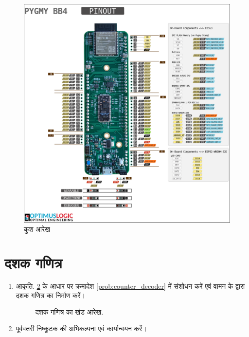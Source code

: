 \documentclass[journal,12pt,twocolumn]{IEEEtran}
\renewcommand\thesection{\arabic{section}}
\begin{document}
\begin{enumerate}[label=\thesection.\arabic*.,ref=\thesection.\theenumi]
\begin{figure}[!ht]
\centering
\includegraphics[width = \textwidth]{figs/pin_sheet.png}
\caption{कुश आरेख}
\label{fig:pin_sheet}
\end{figure}
\end{enumerate}

\section{दशक गणित्र}
\renewcommand{\theequation}{\theenumi}
\renewcommand{\thefigure}{\theenumi}
\begin{enumerate}[label=\thesection.\arabic*.,ref=\thesection.\theenumi]

\item आकृति. \ref{fig:vaman_decade_counter} के आधार पर क्रमादेश \ref{prob:counter_decoder}
में संशोधन करें एवं वामन के द्वारा दशक गणित्र का निर्माण करें।
\begin{figure}[!ht]
\centering
\resizebox{\columnwidth}{!}{

}
\caption{दशक गणित्र का खंड आरेख.}
\label{fig:vaman_decade_counter}
\end{figure}
\item पूर्ववतरी निष्कूटक की अभिकल्पना एवं कार्यान्वयन करें।

\end{enumerate}
%
\end{document}
